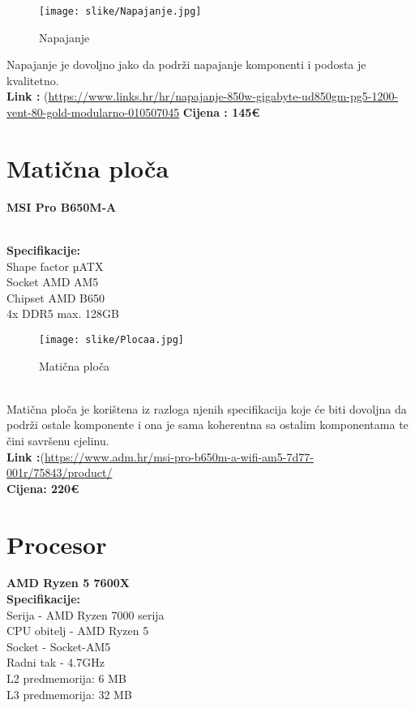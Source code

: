 \documentclass{article}
\begin{document}
\begin{figure}[!h]
    \texttt{[image: slike/Napajanje.jpg]}
    \caption{Napajanje}
    \label{fig:enter-label}
\end{figure}
Napajanje je dovoljno jako da podrži napajanje komponenti i podosta je kvalitetno.
\\ \textbf{Link :} (\url{https://www.links.hr/hr/napajanje-850w-gigabyte-ud850gm-pg5-1200-vent-80-gold-modularno-010507045}
\textbf{Cijena : 145€}

\newpage

\section{Matična ploča}
\textbf{MSI Pro B650M-A}

\\ \textbf{Specifikacije:}
\\ Shape factor µATX
\\Socket AMD AM5
\\ Chipset AMD B650
\\4x DDR5 max. 128GB

\begin{figure}[h!]
    \centering
    \texttt{[image: slike/Plocaa.jpg]}
    \caption{Matična ploča}
    \label{fig:method}
\end{figure}

\\Matična ploča je korištena iz razloga njenih specifikacija koje će biti dovoljna da podrži ostale komponente i ona je sama koherentna sa ostalim komponentama te čini savršenu cjelinu. 
\\ \textbf{Link :}(\url{https://www.adm.hr/msi-pro-b650m-a-wifi-am5-7d77-001r/75843/product/}
\\ \textbf{Cijena: 220€}

\newpage
\section{Procesor}
\textbf{AMD Ryzen 5 7600X}
\\ \textbf{Specifikacije:}
\\ Serija - AMD Ryzen 7000 serija
\\ CPU obitelj - AMD Ryzen 5
\\ Socket - Socket-AM5
\\ Radni tak - 4.7GHz
\\ L2 predmemorija: 6 MB
\\ L3 predmemorija: 32 MB
\end{document}
